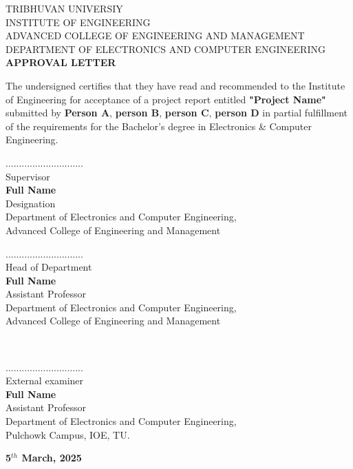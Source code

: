 \documentclass[main]{subfiles}
\begin{document}
\vspace{1.5cm}
\begin{center}
\uppercase{
Tribhuvan Universiy\\
Institute of Engineering\\
ADVANCED COLLEGE OF ENGINEERING AND MANAGEMENT\\
Department of Electronics and Computer Engineering\\
\vspace{1CM}
\Large{\textbf{APPROVAL LETTER}}
    }

    \end{center}
\vspace{1 CM}
The undersigned certifies that they have read and recommended to the Institute of Engineering for acceptance of a project report entitled \textbf{"Project Name"} submitted by \textbf{Person A}, \textbf{person B}, \textbf{person C}, \textbf{person D} in partial fulfillment of the requirements for the Bachelor's degree in Electronics \& Computer Engineering.\\

\vspace{1cm}
\begin{minipage}{.5\textwidth}
        \raggedright
    .............................\\
    Supervisor\\
    \textbf{Full Name}\\
    Designation\\
    Department of Electronics and Computer Engineering,\\
    Advanced College of Engineering and Management\\
    \end{minipage}%
    \begin{minipage}{0.5\textwidth}
    \raggedleft
    .............................\\
    Head of Department\\
    \textbf{Full Name}\\
    Assistant Professor\\
    Department of Electronics and Computer Engineering,\\
    Advanced College of Engineering and Management\\
    \end{minipage}\\
    \vspace{.8cm}
    \begin{center}
    .............................\\
    External examiner\\
    \textbf{Full Name}\\
    Assistant Professor\\
    Department of Electronics and Computer Engineering,\\
    Pulchowk Campus, IOE, TU.\\
    \vspace{.6cm}
    \end{center}

\vfill
\centerline{{\textbf{	5$^{th}$ March, 2025}}}
\end{document}
